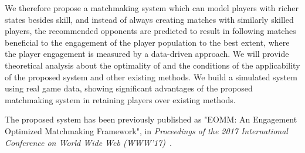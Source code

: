 We therefore propose a matchmaking system which can model players with richer states besides skill, and instead of always creating matches with similarly skilled players, the recommended opponents are predicted to result in following matches beneficial to the engagement of the  player population to the best extent, where the player engagement is measured by a data-driven approach. We will provide theoretical analysis about the optimality of and the conditions of the applicability of the proposed system and other existing methods. We build a simulated system using real game data, showing significant advantages of the proposed matchmaking system in retaining players over existing methods. 

The proposed system has been previously published as "EOMM: An Engagement Optimized Matchmaking Framework", in \textit{Proceedings of the 2017 International Conference on World Wide Web (WWW'17)}~\cite{chen2017eomm}.








